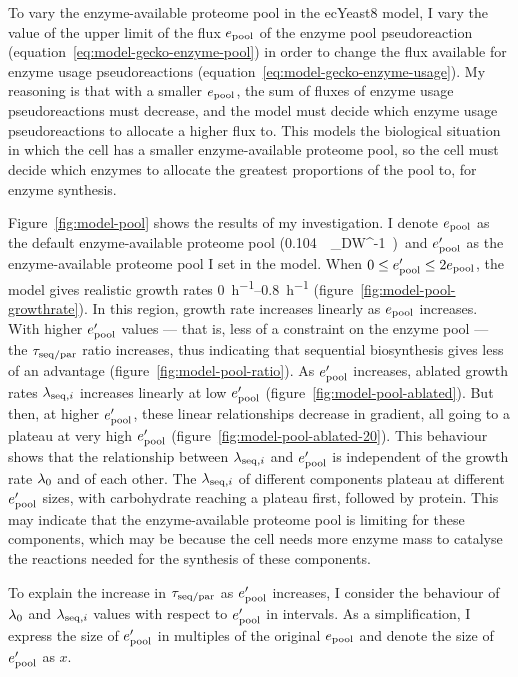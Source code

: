 To vary the enzyme-available proteome pool in the ecYeast8 model,
I vary the value of the upper limit of the flux $e_{\mathrm{pool}}$ of the enzyme pool pseudoreaction (equation~\ref{eq:model-gecko-enzyme-pool}) in order to change the flux available for enzyme usage pseudoreactions (equation~\ref{eq:model-gecko-enzyme-usage}).
My reasoning is that with a smaller $e_{\mathrm{pool}}$, the sum of fluxes of enzyme usage pseudoreactions must decrease, and the model must decide which enzyme usage pseudoreactions to allocate a higher flux to.
This models the biological situation in which the cell has a smaller enzyme-available proteome pool, so the cell must decide which enzymes to allocate the greatest proportions of the pool to, for enzyme synthesis.

Figure~\ref{fig:model-pool} shows the results of my investigation.
I denote $e_{\mathrm{pool}}$ as the default enzyme-available proteome pool (\SI{0.104}{\gram~\gram_{DW}^{-1}}) and $e_{\mathrm{pool}}^{\prime}$ as the enzyme-available proteome pool I set in the model.
When $0 \leq e_{\mathrm{pool}}^{\prime} \leq 2e_{\mathrm{pool}}$, the model gives realistic growth rates \SIrange{0}{0.8}{\hour^{-1}} (figure~\ref{fig:model-pool-growthrate}).
In this region, growth rate increases linearly as $e_{\mathrm{pool}}$ increases.
With higher $e_{\mathrm{pool}}^{\prime}$ values --- that is, less of a constraint on the enzyme pool --- the $\tau_{\mathrm{seq}/\mathrm{par}}$ ratio increases, thus indicating that sequential biosynthesis gives less of an advantage (figure~\ref{fig:model-pool-ratio}).
As $e_{\mathrm{pool}}^{\prime}$ increases, ablated growth rates $\lambda_{\mathrm{seq},i}$ increases linearly at low $e_{\mathrm{pool}}^{\prime}$ (figure~\ref{fig:model-pool-ablated}).
But then, at higher $e_{\mathrm{pool}}^{\prime}$, these linear relationships decrease in gradient, all going to a plateau at very high $e_{\mathrm{pool}}^{\prime}$ (figure~\ref{fig:model-pool-ablated-20}).
This behaviour shows that the relationship between $\lambda_{\mathrm{seq},i}$ and $e_{\mathrm{pool}}^{\prime}$ is independent of the growth rate $\lambda_{0}$ and of each other.
The $\lambda_{\mathrm{seq},i}$ of different components plateau at different $e_{\mathrm{pool}}^{\prime}$ sizes, with carbohydrate reaching a plateau first, followed by protein.
This may indicate that the enzyme-available proteome pool is limiting for these components, which may be because the cell needs more enzyme mass to catalyse the reactions needed for the synthesis of these components.

To explain the increase in $\tau_{\mathrm{seq}/\mathrm{par}}$ as $e_{\mathrm{pool}}^{\prime}$ increases, I consider the behaviour of $\lambda_{0}$ and $\lambda_{\mathrm{seq},i}$ values with respect to $e_{\mathrm{pool}}^{\prime}$ in intervals.
As a simplification, I express the size of $e_{\mathrm{pool}}^{\prime}$ in multiples of the original $e_{\mathrm{pool}}$ and denote the size of $e_{\mathrm{pool}}^{\prime}$ as $x$.

